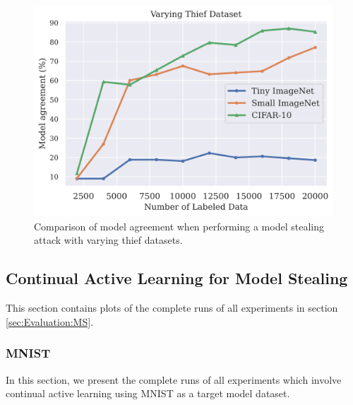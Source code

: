 \begin{figure}[h]
    \centering
    \includegraphics[width=0.8\linewidth]{images/results_CALMS/effect_dataset.png}
    \caption{Comparison of model agreement when performing a model stealing attack with varying thief datasets.}
    \label{fig:Appendix:MS:ActiveThief:EffectDataset}
\end{figure}

\clearpage


\subsection{Continual Active Learning for Model Stealing}
\label{sec:Appendix:CALMS}
This section contains plots of the complete runs of all experiments in section \ref{sec:Evaluation:MS}.

\subsubsection{MNIST}
\label{sec:Appendix:CALMS:MNIST}
In this section, we present the complete runs of all experiments which involve continual active learning using MNIST as a target model dataset.

